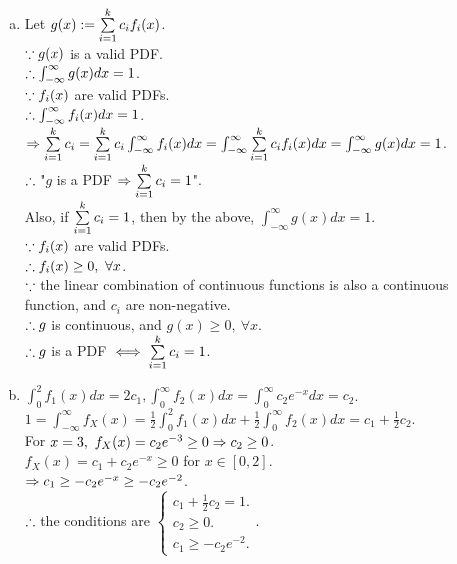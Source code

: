 \begin{pr}$ $
\begin{enumerate}[(a)]
\item Let $g(x):=\sum\limits_{i=1}^kc_if_i(x)$.\\
$\because g(x)$ is a valid PDF.\\
$\therefore\int_{-\infty}^\infty g(x)dx=1$.\\
$\because f_i(x)$ are valid PDFs.\\
$\therefore\int_{-\infty}^\infty f_i(x)dx=1$.\\
$\Rightarrow\sum\limits_{i=1}^kc_i=\sum\limits_{i=1}^kc_i\int_{-\infty}^\infty f_i(x)dx=\int_{-\infty}^\infty\sum\limits_{i=1}^kc_if_i(x)dx=\int_{-\infty}^\infty g(x)dx=1$.\\
$\therefore$ "$g$ is a PDF $\Rightarrow\sum\limits_{i=1}^kc_i=1$".\\
Also, if $\sum\limits_{i=1}^kc_i=1$, then by the above, $\int_{-\infty}^\infty g(x)dx=1$.\\
$\because f_i(x)$ are valid PDFs.\\
$\therefore f_i(x)\geq0,\ \forall x$.\\
$\because$ the linear combination of continuous functions is also a continuous function, and $c_i$ are non-negative.\\
$\therefore g$ is continuous, and $g(x)\geq0,\ \forall x$.\\
$\therefore g$ is a PDF $\iff\sum\limits_{i=1}^kc_i=1$.
\item $\int_0^2f_1(x)dx=2c_1, \int_0^\infty f_2(x)dx=\int_0^\infty c_2e^{-x}dx=c_2$.\\
$1=\int_{-\infty}^\infty f_X(x)=\frac12\int_0^2f_1(x)dx+\frac12\int_0^\infty f_2(x)dx=c_1+\frac12c_2$.\\
For $x=3,\ f_X(x)=c_2e^{-3}\geq0\Rightarrow c_2\geq0$.\\
$f_X(x)=c_1+c_2e^{-x}\geq0$ for $x\in[0, 2]$.\\
$\Rightarrow c_1\geq-c_2e^{-x}\geq-c_2e^{-2}$.\\
$\therefore$ the conditions are $\begin{cases}
c_1+\frac12c_2=1.\\
c_2\geq0.\\
c_1\geq-c_2e^{-2}.
\end{cases}$.
\end{enumerate}
\end{pr}
